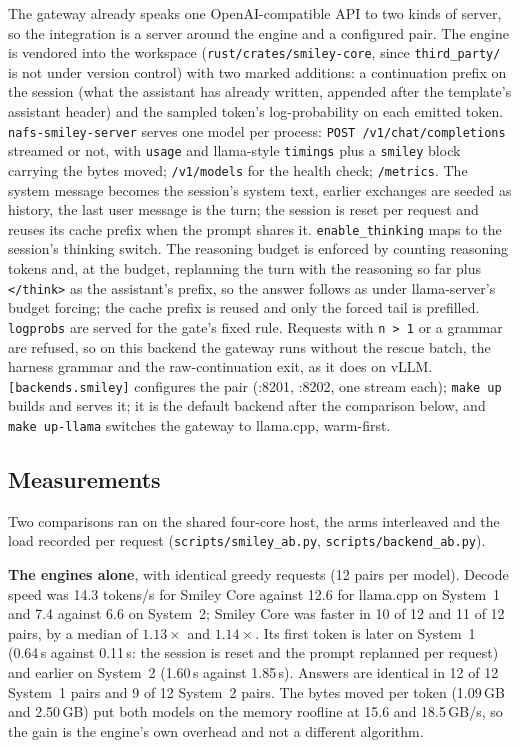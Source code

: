 The gateway already speaks one OpenAI-compatible API to two kinds of server, so the integration is a server around the engine
and a configured pair. The engine is vendored into the workspace (\texttt{rust/crates/smiley-core}, since \texttt{third\_party/}
is not under version control) with two marked additions: a continuation prefix on the session (what the assistant has already
written, appended after the template's assistant header) and the sampled token's log-probability on each emitted token.
\texttt{nafs-smiley-server} serves one model per process: \texttt{POST /v1/chat/completions} streamed or not, with
\texttt{usage} and llama-style \texttt{timings} plus a \texttt{smiley} block carrying the bytes moved; \texttt{/v1/models} for
the health check; \texttt{/metrics}. The system message becomes the session's system text, earlier exchanges are seeded as
history, the last user message is the turn; the session is reset per request and reuses its cache prefix when the prompt shares
it. \texttt{enable\_thinking} maps to the session's thinking switch. The reasoning budget is enforced by counting reasoning
tokens and, at the budget, replanning the turn with the reasoning so far plus \texttt{</think>} as the assistant's prefix, so
the answer follows as under llama-server's budget forcing; the cache prefix is reused and only the forced tail is prefilled.
\texttt{logprobs} are served for the gate's fixed rule. Requests with \texttt{n > 1} or a grammar are refused, so on this
backend the gateway runs without the rescue batch, the harness grammar and the raw-continuation exit, as it does on vLLM.
\texttt{[backends.smiley]} configures the pair (:8201, :8202, one stream each); \texttt{make up} builds and serves it; it is the
default backend after the comparison below, and \texttt{make up-llama} switches the gateway to llama.cpp, warm-first.

\subsection{Measurements}

Two comparisons ran on the shared four-core host, the arms interleaved and the load recorded per request
(\texttt{scripts/smiley\_ab.py}, \texttt{scripts/backend\_ab.py}).

\textbf{The engines alone}, with identical greedy requests (12 pairs per model). Decode speed was 14.3 tokens/s for Smiley Core
against 12.6 for llama.cpp on System~1 and 7.4 against 6.6 on System~2; Smiley Core was faster in 10 of 12 and 11 of 12 pairs,
by a median of $1.13\times$ and $1.14\times$. Its first token is later on System~1 (0.64\,s against 0.11\,s: the session is reset
and the prompt replanned per request) and earlier on System~2 (1.60\,s against 1.85\,s). Answers are identical in 12 of 12
System~1 pairs and 9 of 12 System~2 pairs. The bytes moved per token (1.09\,GB and 2.50\,GB) put both models on the memory
roofline at 15.6 and 18.5\,GB/s, so the gain is the engine's own overhead and not a different algorithm.

